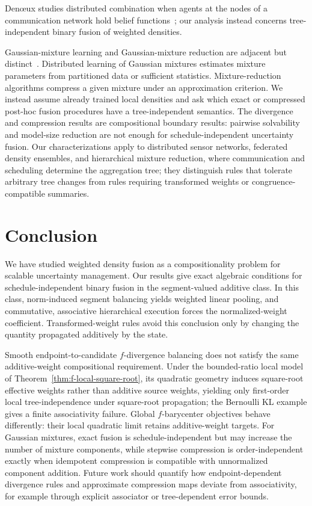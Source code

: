 \documentclass[runningheads]{llncs}
\begin{document}
Den{\oe}ux studies distributed combination when agents at the nodes of a communication network hold belief functions~\cite{denoeux2021distributed}; our analysis instead concerns tree-independent binary fusion of weighted densities.

Gaussian-mixture learning and Gaussian-mixture reduction are adjacent but distinct~\cite{dempster1977maximum,mclachlan2000finite,runnalls2007kullback,zhang2022distributed}. Distributed learning of Gaussian mixtures estimates mixture parameters from partitioned data or sufficient statistics. Mixture-reduction algorithms compress a given mixture under an approximation criterion. We instead assume already trained local densities and ask which exact or compressed post-hoc fusion procedures have a tree-independent semantics. The divergence and compression results are compositional boundary results: pairwise solvability and model-size reduction are not enough for schedule-independent uncertainty fusion. Our characterizations apply to distributed sensor networks, federated density ensembles, and hierarchical mixture reduction, where communication and scheduling determine the aggregation tree; they distinguish rules that tolerate arbitrary tree changes from rules requiring transformed weights or congruence-compatible summaries.


\section{Conclusion}\label{sec:conclusion}

We have studied weighted density fusion as a compositionality problem for scalable uncertainty management. Our results give exact algebraic conditions for schedule-independent binary fusion in the segment-valued additive class. In this class, norm-induced segment balancing yields weighted linear pooling, and commutative, associative hierarchical execution forces the normalized-weight coefficient. Transformed-weight rules avoid this conclusion only by changing the quantity propagated additively by the state.

Smooth endpoint-to-candidate $f$-divergence balancing does not satisfy the
same additive-weight compositional requirement. Under the bounded-ratio local
model of Theorem~\ref{thm:f-local-square-root}, its quadratic geometry induces
square-root effective weights rather than additive source weights, yielding only
first-order local tree-independence under square-root propagation; the Bernoulli
KL example gives a finite associativity failure. Global $f$-barycenter
objectives behave differently: their local quadratic limit retains additive-weight
targets. For Gaussian mixtures, exact fusion is schedule-independent but may
increase the number of mixture components, while stepwise compression is order-independent
exactly when idempotent compression is compatible with unnormalized component
addition. Future work should quantify how endpoint-dependent divergence rules and
approximate compression maps deviate from associativity, for example through
explicit associator or tree-dependent error bounds.
\end{document}
